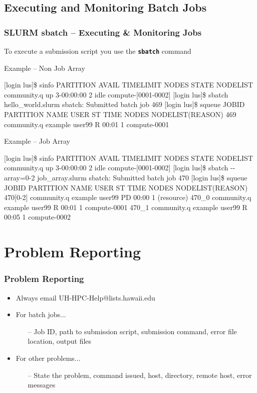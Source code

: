 \documentclass[t,hyperref={pdfpagelabels=false}]{beamer}
\newcommand{\ddash}{-{}-}
\begin{document}
\subsection{Executing and Monitoring Batch Jobs}
\begin{frame}[fragile]
\frametitle{SLURM sbatch -- Executing \& Monitoring Jobs}\footnotesize
To execute a submission script you use the \textbf{\texttt{sbatch}} command
\begin{block}{Example -- Non Job Array}
\begin{semiverbatim}\tiny
[login lus]\$ sinfo
PARTITION     AVAIL  TIMELIMIT  NODES  STATE NODELIST
community.q   up     3-00:00:00 2      idle  compute-[0001-0002]
[login lus]\$ sbatch hello_world.slurm
sbatch: Submitted batch job 469
[login lus]\$ squeue
JOBID PARTITION    NAME     USER    ST TIME  NODES  NODELIST(REASON)
469   community.q  example  user99  R  00:01 1      compute-0001
\end{semiverbatim}
\end{block}
\begin{block}{Example -- Job Array}
\begin{semiverbatim}\tiny
[login lus]\$ sinfo
PARTITION     AVAIL  TIMELIMIT  NODES  STATE NODELIST
community.q   up     3-00:00:00 2      idle  compute-[0001-0002]
[login lus]\$ sbatch {\ddash}array=0-2 job_array.slurm
sbatch: Submitted batch job 470
[login lus]\$ squeue
JOBID     PARTITION    NAME     USER    ST   TIME    NODES  NODELIST(REASON)
470[0-2]  community.q  example  user99  PD   00:00   1      (resource)
470_0     community.q  example  user99  R    00:01   1      compute-0001
470_1     community.q  example  user99  R    00:05   1      compute-0002
\end{semiverbatim}
\end{block}


\end{frame}



\section{Problem Reporting}
\begin{frame}
\frametitle{Problem Reporting}
\begin{itemize}
\item Always email UH-HPC-Help@lists.hawaii.edu
\item For batch jobs...
\begin{itemize}
\item[--] Job ID, path to submission script, submission command, error file location, output files
\end{itemize} 
\item For other problems...
\begin{itemize}
\item[--] State the problem, command issued, host, directory, remote host, error messages
\end{itemize}
\end{itemize}
\end{frame}
\end{document}

